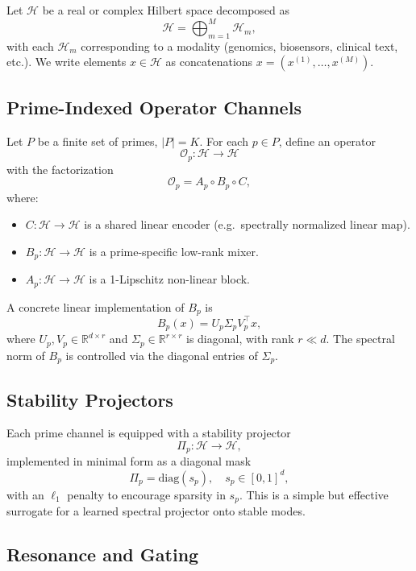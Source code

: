 \documentclass[11pt]{article}
\begin{document}
Let \(\mathcal{H}\) be a real or complex Hilbert space decomposed as
\[
  \mathcal{H} = \bigoplus_{m=1}^{M} \mathcal{H}_m,
\]
with each \(\mathcal{H}_m\) corresponding to a modality (genomics, biosensors, clinical text, etc.).
We write elements \(x \in \mathcal{H}\) as concatenations \(x = (x^{(1)}, \dots, x^{(M)})\).

\subsection{Prime-Indexed Operator Channels}

Let \(P\) be a finite set of primes, \(|P| = K\).
For each \(p \in P\), define an operator
\[
  \mathcal{O}_p : \mathcal{H} \to \mathcal{H}
\]
with the factorization
\[
  \mathcal{O}_p = A_p \circ B_p \circ C,
\]
where:
\begin{itemize}[leftmargin=*]
  \item \(C : \mathcal{H} \to \mathcal{H}\) is a shared linear encoder (e.g.\ spectrally normalized linear map).
  \item \(B_p : \mathcal{H} \to \mathcal{H}\) is a prime-specific low-rank mixer.
  \item \(A_p : \mathcal{H} \to \mathcal{H}\) is a 1-Lipschitz non-linear block.
\end{itemize}

A concrete linear implementation of \(B_p\) is
\[
  B_p(x) = U_p \Sigma_p V_p^\top x,
\]
where \(U_p, V_p \in \mathbb{R}^{d \times r}\) and \(\Sigma_p \in \mathbb{R}^{r \times r}\) is diagonal, with rank \(r \ll d\).
The spectral norm of \(B_p\) is controlled via the diagonal entries of \(\Sigma_p\).

\subsection{Stability Projectors}

Each prime channel is equipped with a stability projector
\[
  \Pi_p : \mathcal{H} \to \mathcal{H},
\]
implemented in minimal form as a diagonal mask
\[
  \Pi_p = \mathrm{diag}(s_p), \quad s_p \in [0,1]^d,
\]
with an \(\ell_1\) penalty to encourage sparsity in \(s_p\).
This is a simple but effective surrogate for a learned spectral projector onto stable modes.

\subsection{Resonance and Gating}
\end{document}
